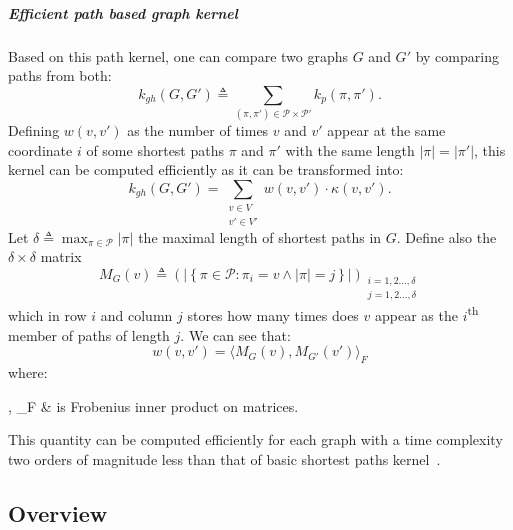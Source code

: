                 \subparagraph{Efficient path based graph kernel}
                    Based on this path kernel, one can compare two graphs \(G\) and \(G'\) by comparing paths from both:
                    \begin{equation}
                        \label{eq::graph_hopper_kernel}
                        k_{gh}(G, G') \triangleq \sum_{(\pi, \pi') \in \mathscr{P} \times \mathscr{P}'} k_p(\pi, \pi').
                    \end{equation}
                    Defining \(w(v, v')\) as the number of times \(v\) and \(v'\) appear at the same coordinate \(i\) of some shortest paths \(\pi\) and \(\pi'\) with the same length \(\vert \pi \vert = \vert \pi' \vert\), this kernel can be computed efficiently as it can be transformed into:
                    \begin{equation}
                        \label{eq::graph_hopper_kernel_second}
                        k_{gh}(G, G') = \sum_{\substack{v \in V\\v' \in V'}} w(v, v')\cdot \kappa(v, v').
                    \end{equation}
                    Let \(\delta \triangleq \max_{\pi \in \mathscr{P}} \vert \pi \vert\) the maximal length of shortest paths in \(G\).
                    Define also the \(\delta \times \delta\) matrix
                    \begin{equation*}
                        M_G(v) \triangleq \left(\left\lvert\left\{\pi \in \mathscr{P}: \pi_i = v \wedge \left\lvert\pi\right\rvert = j \right\}\right\rvert\right)_{\substack{i=1,2\dots,\delta\\j=1,2\dots,\delta}}
                    \end{equation*}
                    which in row \(i\) and column \(j\) stores how many times does \(v\) appear as the \(i\)\textsuperscript{th} member of paths of length \(j\).
                    We can see that:
                    \begin{equation}
                        \label{eq::w_as_matrix_inner_product}
                        w(v, v') = \langle M_G(v), M_{G'}(v')\rangle_F
                    \end{equation}
                    where:
                    \begin{conditions}
                        \langle \bullet, \bullet \rangle_F & is Frobenius inner product on matrices.
                    \end{conditions}
                    This quantity can be computed efficiently for each graph with a time complexity two orders of magnitude less than that of basic shortest paths kernel~\parencite{feragen2013scalable}.

    \subsection{Overview}
        \label{subsec::state_of_the_art::mlpr::overview}
